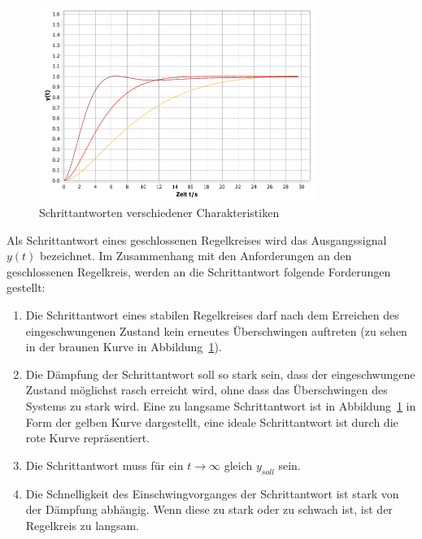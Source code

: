\begin{figure}[h!, width=\pagewidth]
    \begin{center}
    \includegraphics[width=0.8\textwidth]{images/schrittantworten.png}
    \caption{Schrittantworten verschiedener Charakteristiken}
    \label{fig:stepresponse}
    \end{center}
\end{figure}

Als Schrittantwort  eines geschlossenen  Regelkreises wird  das Ausgangssignal
$y(t)$ bezeichnet. Im Zusammenhang mit  den Anforderungen an den geschlossenen
Regelkreis, werden an die Schrittantwort folgende Forderungen gestellt:
\begin{enumerate}
    \item
        Die Schrittantwort eines stabilen Regelkreises darf nach dem Erreichen
        des eingeschwungenen  Zustand kein erneutes  \"Uberschwingen auftreten
        (zu sehen in der braunen Kurve in Abbildung~\ref{fig:stepresponse}).
    \item
        Die  D\"ampfung  der  Schrittantwort  soll so  stark  sein,  dass  der
        eingeschwungene  Zustand m\"oglichst  rasch erreicht  wird, ohne  dass
        das  \"Uberschwingen  des  Systems  zu stark  wird. Eine  zu  langsame
        Schrittantwort  ist in  Abbildung~\ref{fig:stepresponse}  in Form  der
        gelben  Kurve dargestellt,  eine ideale  Schrittantwort ist  durch die
        rote Kurve repr\"asentiert.
    \item
        Die   Schrittantwort  muss   f\"ur  ein   $t\rightarrow\infty$  gleich
        $y_{soll}$ sein.
    \item
        Die Schnelligkeit des Einschwingvorganges der Schrittantwort ist stark
        von der  D\"ampfung abh\"angig. Wenn  diese zu  stark oder  zu schwach
        ist, ist der Regelkreis zu langsam.
\end{enumerate}
